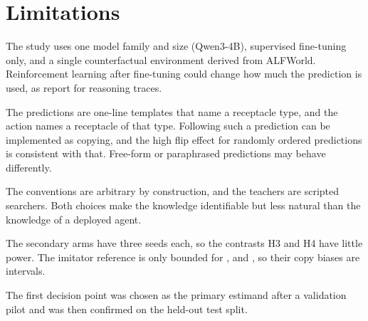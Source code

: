\section*{Limitations}

The study uses one model family and size (Qwen3-4B), supervised fine-tuning only, and a single counterfactual environment derived from ALFWorld. Reinforcement learning after fine-tuning could change how much the prediction is used, as \citet{liu2026cotgains} report for reasoning traces.

The predictions are one-line templates that name a receptacle type, and the action names a receptacle of that type. Following such a prediction can be implemented as copying, and the high flip effect for randomly ordered predictions is consistent with that. Free-form or paraphrased predictions may behave differently.

The conventions are arbitrary by construction, and the teachers are scripted searchers. Both choices make the knowledge identifiable but less natural than the knowledge of a deployed agent.

The secondary arms have three seeds each, so the contrasts H3 and H4 have little power. The imitator reference is only bounded for ,  and , so their copy biases are intervals.

The first decision point was chosen as the primary estimand after a validation pilot and was then confirmed on the held-out test split.
